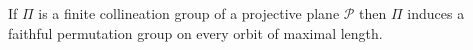 If $\Pi$ is a finite collineation group of a projective plane $\mathcal{P}$ then $\Pi$ induces a faithful permutation group on every orbit of maximal length.
